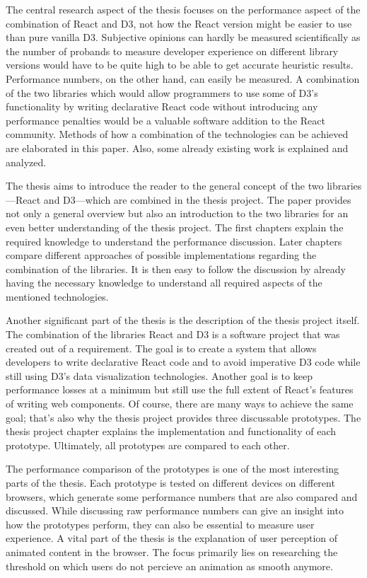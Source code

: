 The central research aspect of the thesis focuses on the performance aspect of the combination of React and D3, not how the React version might be easier to use than pure vanilla D3. Subjective opinions can hardly be measured scientifically as the number of probands to measure developer experience on different library versions would have to be quite high to be able to get accurate heuristic results. Performance numbers, on the other hand, can easily be measured. A combination of the two libraries which would allow programmers to use some of D3's functionality by writing declarative React code without introducing any performance penalties would be a valuable software addition to the React community. Methods of how a combination of the technologies can be achieved are elaborated in this paper. Also, some already existing work is explained and analyzed.

The thesis aims to introduce the reader to the general concept of the two libraries---React and D3---which are combined in the thesis project. The paper provides not only a general overview but also an introduction to the two libraries for an even better understanding of the thesis project. The first chapters explain the required knowledge to understand the performance discussion. Later chapters compare different approaches of possible implementations regarding the combination of the libraries. It is then easy to follow the discussion by already having the necessary knowledge to understand all required aspects of the mentioned technologies.

Another significant part of the thesis is the description of the thesis project itself. The combination of the libraries React and D3 is a software project that was created out of a requirement. The goal is to create a system that allows developers to write declarative React code and to avoid imperative D3 code while still using D3's data visualization technologies. Another goal is to keep performance losses at a minimum but still use the full extent of React's features of writing web components. Of course, there are many ways to achieve the same goal; that's also why the thesis project provides three discussable prototypes. The thesis project chapter explains the implementation and functionality of each prototype. Ultimately, all prototypes are compared to each other.

The performance comparison of the prototypes is one of the most interesting parts of the thesis. Each prototype is tested on different devices on different browsers, which generate some performance numbers that are also compared and discussed. While discussing raw performance numbers can give an insight into how the prototypes perform, they can also be essential to measure user experience. A vital part of the thesis is the explanation of user perception of animated content in the browser. The focus primarily lies on researching the threshold on which users do not percieve an animation as smooth anymore.

